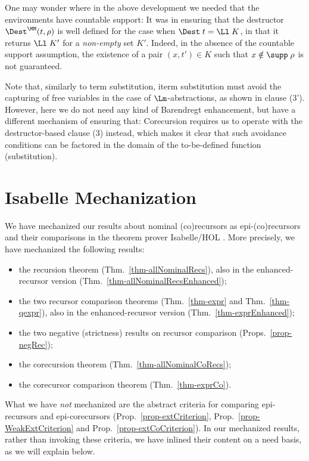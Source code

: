 One may wonder where in the above development we needed that the environments have countable support: It was in ensuring that the destructor $\Dest^\MM(t,\rho)$ is well defined for the case when $\Dest\;t=\Ll\;K$, in that it returns $\Ll\;K'$ for a \emph{non-empty} set $K'$. 
%
Indeed, in the absence of the countable support assumption, the existence of a pair $(x,t') \in K$ such that $x\notin \supp\;\rho$ is not guaranteed. 

\medskip
Note that, similarly to term substitution, iterm  substitution must avoid the capturing of free variables in the case of $\Lm$-abstractions, as shown in clause (3'). However, here we do not need any kind of Barendregt enhancement, but have a different mechanism of ensuring that: Corecursion requires us to operate with the destructor-based clause (3) instead, which makes it clear that such avoidance conditions can be factored in the domain of the to-be-defined function (substitution).  





\section{Isabelle Mechanization}
\label{app-isa}

We have mechanized our results about nominal (co)recursors as epi-(co)recursors and their comparisons in the theorem prover Isabelle/HOL \cite{LNCS2283}. More precisely, we have mechanized the following results:
\begin{itemize}
	\item the recursion theorem (Thm.~\ref{thm-allNominalRecs}), also in the enhanced-recursor version (Thm.~\ref{thm-allNominalRecsEnhanced}); 
	\item the two recursor comparison theorems (Thm.~\ref{thm-expr} and Thm.~\ref{thm-qexpr}), also in the enhanced-recursor version (Thm.~\ref{thm-exprEnhanced}); 
	\item the two negative (strictness) results on recursor comparison (Props.~\ref{prop-negRec}); 
	\item the corecursion theorem (Thm.~\ref{thm-allNominalCoRecs}); 
	\item the corecursor comparison theorem (Thm.~\ref{thm-exprCo}). 
\end{itemize}
%
What we have \emph{not} mechanized are the abstract criteria for comparing epi-recursors and epi-corecursors (Prop.~\ref{prop-extCriterion}, Prop.~\ref{prop-WeakExtCriterion} and Prop.~\ref{prop-extCoCriterion}). In our mechanized results, rather than invoking these criteria, we have inlined their content on a need basis, as we will explain below. 



